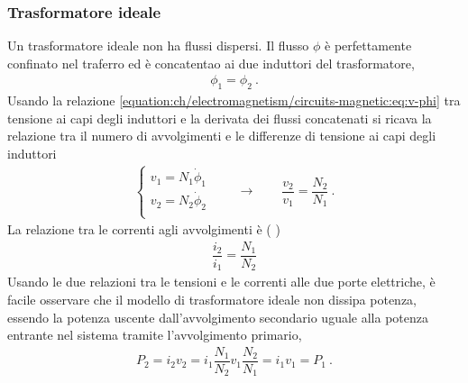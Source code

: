 \documentclass[letterpaper,10pt,italian]{jupyterBook}
\begin{document}
\subsubsection{Trasformatore ideale}
\label{\detokenize{ch/electromagnetism/circuits-magnetic:trasformatore-ideale}}\label{\detokenize{ch/electromagnetism/circuits-magnetic:physics-hs-electromagnetism-circuits-magnetic-transformer-ideal}}
\sphinxAtStartPar
Un trasformatore ideale non ha flussi dispersi. Il flusso \(\phi\) è perfettamente confinato nel traferro ed è concatentao ai due induttori del trasformatore,
\begin{equation*}
\begin{split}\phi_1 = \phi_2 \ .\end{split}
\end{equation*}
\sphinxAtStartPar
Usando la relazione \eqref{equation:ch/electromagnetism/circuits-magnetic:eq:v-phi} tra tensione ai capi degli induttori e la derivata dei flussi concatenati si ricava la relazione tra il numero di avvolgimenti e le differenze di tensione ai capi degli induttori
\begin{equation}\label{equation:ch/electromagnetism/circuits-magnetic:eq:transformer:ideal:v-ratio}
\begin{split}\begin{cases}
  v_1 = N_1 \dot{\phi}_1 \\
  v_2 = N_2 \dot{\phi}_2 \\
\end{cases}
\qquad \rightarrow \qquad
\dfrac{v_2}{v_1} = \dfrac{N_2}{N_1} \ .
\end{split}
\end{equation}
\sphinxAtStartPar
La relazione tra le correnti agli avvolgimenti è ( )
\begin{equation}\label{equation:ch/electromagnetism/circuits-magnetic:eq:transformer:ideal:i-ratio}
\begin{split}\dfrac{i_2}{i_1} = \dfrac{N_1}{N_2}\end{split}
\end{equation}
\sphinxAtStartPar
Usando le due relazioni tra le tensioni e le correnti alle due porte elettriche, è facile osservare che il modello di trasformatore ideale non dissipa potenza, essendo la potenza uscente dall’avvolgimento secondario uguale alla potenza entrante nel sistema tramite l’avvolgimento primario,
\begin{equation*}
\begin{split}P_2 = i_2 v_2 = i_1 \dfrac{N_1}{N_2} v_1 \dfrac{N_2}{N_1} = i_1 v_1 = P_1 \ .\end{split}
\end{equation*}
\end{document}
